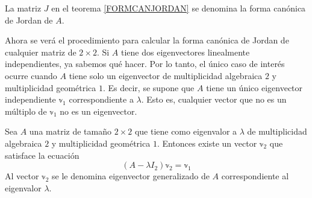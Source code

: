 \begin{definition}
    La matriz $J$ en el teorema \ref{FORMCANJORDAN} se denomina la forma canónica de Jordan de $A$.
\end{definition}

Ahora se verá el procedimiento para calcular la forma canónica de Jordan de cualquier matriz de $2 \times 2$. Si $A$ tiene dos eigenvectores linealmente independientes, ya sabemos qué hacer. Por lo tanto, el único caso de interés ocurre cuando $A$ tiene solo un eigenvector de multiplicidad algebraica $2$ y multiplicidad geométrica $1$. Es decir, se supone que $A$ tiene un único eigenvector independiente $\mathbb{v}_1$ correspondiente a $\lambda$. Esto es, cualquier vector que no es un múltiplo de $\mathbb{v}_1$ no es un eigenvector.

\begin{theorem}
    Sea $A$ una matriz de tamaño $2 \times 2$ que tiene como eigenvalor a $\lambda$ de multiplicidad algebraica $2$ y multiplicidad geométrica $1$. Entonces existe un vector $\mathbb{v}_2$ que satisface la ecuación
    $$(A - \lambda I_2)\mathbb{v}_2 = \mathbb{v}_1$$
    Al vector $\mathbb{v}_2$ se le denomina eigenvector generalizado de $A$ correspondiente al eigenvalor $\lambda$.
\end{theorem}

